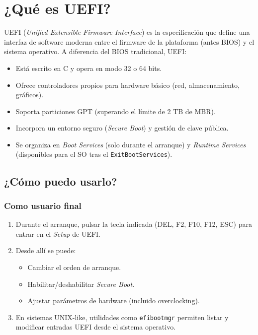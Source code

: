 \section{¿Qué es UEFI?}

UEFI (\emph{Unified Extensible Firmware Interface}) es la especificación que define una
interfaz de software moderna entre el firmware de la plataforma (antes BIOS) y el
sistema operativo. A diferencia del BIOS tradicional, UEFI:
\begin{itemize}[noitemsep]
  \item Está escrito en C y opera en modo 32 o 64 bits.
  \item Ofrece controladores propios para hardware básico (red, almacenamiento, gráficos).
  \item Soporta particiones GPT (superando el límite de 2 TB de MBR).
  \item Incorpora un entorno seguro (\emph{Secure Boot}) y gestión de clave pública.
  \item Se organiza en \emph{Boot Services} (solo durante el arranque) y
        \emph{Runtime Services} (disponibles para el SO tras el \texttt{ExitBootServices}).
\end{itemize}

\subsection{¿Cómo puedo usarlo?}

\subsubsection*{Como usuario final}
\begin{enumerate}[noitemsep]
  \item Durante el arranque, pulsar la tecla indicada (DEL, F2, F10, F12, ESC) para
        entrar en el \emph{Setup} de UEFI.
  \item Desde allí se puede:
    \begin{itemize}[noitemsep]
      \item Cambiar el orden de arranque.
      \item Habilitar/deshabilitar \emph{Secure Boot}.
      \item Ajustar parámetros de hardware (incluido overclocking).
    \end{itemize}
  \item En sistemas UNIX-like, utilidades como \texttt{efibootmgr} permiten listar y
        modificar entradas UEFI desde el sistema operativo.
\end{enumerate}

